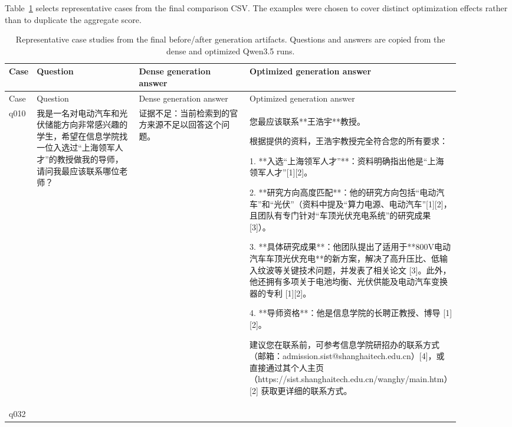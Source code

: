 \documentclass{article}
\begin{document}
\begin{CJK*}{UTF8}{gbsn}
Table~\ref{tab:generation-cases} selects representative cases from the final comparison CSV. The examples were chosen to cover distinct optimization effects rather than to duplicate the aggregate score.

\begingroup
\scriptsize
\setlength{\LTpre}{4pt}
\setlength{\LTpost}{4pt}
\setlength{\tabcolsep}{3pt}
\newcommand{\casecell}[1]{\begin{minipage}[t]{\linewidth}\raggedright\sloppy #1\end{minipage}}
\begin{longtable}{p{0.05\linewidth}p{0.26\linewidth}p{0.29\linewidth}p{0.29\linewidth}}
\caption{Representative case studies from the final before/after generation artifacts. Questions and answers are copied from the dense and optimized Qwen3.5 runs.}
\label{tab:generation-cases}\\
\toprule
Case & Question & Dense generation answer & Optimized generation answer \\
\midrule
\endfirsthead
\toprule
Case & Question & Dense generation answer & Optimized generation answer \\
\midrule
\endhead
\bottomrule
\endfoot
q010 &
\casecell{我是一名对电动汽车和光伏储能方向非常感兴趣的学生，希望在信息学院找一位入选过“上海领军人才”的教授做我的导师，请问我最应该联系哪位老师？} &
\casecell{证据不足：当前检索到的官方来源不足以回答这个问题。} &
\casecell{您最应该联系**王浩宇**教授。\par
根据提供的资料，王浩宇教授完全符合您的所有要求：\par
1. **入选“上海领军人才”**：资料明确指出他是“上海领军人才”[1][2]。\par
2. **研究方向高度匹配**：他的研究方向包括“电动汽车”和“光伏”（资料中提及“算力电源、电动汽车”[1][2]，且团队有专门针对“车顶光伏充电系统”的研究成果 [3]）。\par
3. **具体研究成果**：他团队提出了适用于**800V电动汽车车顶光伏充电**的新方案，解决了高升压比、低输入纹波等关键技术问题，并发表了相关论文 [3]。此外，他还拥有多项关于电池均衡、光伏供能及电动汽车变换器的专利 [1][2]。\par
4. **导师资格**：他是信息学院的长聘正教授、博导 [1][2]。\par
建议您在联系前，可参考信息学院研招办的联系方式（邮箱：admission.\allowbreak sist@\allowbreak shanghaitech.\allowbreak edu.\allowbreak cn）[4]，或直接通过其个人主页（https://sist.\allowbreak shanghaitech.\allowbreak edu.cn/\allowbreak wanghy/\allowbreak main.htm）[2] 获取更详细的联系方式。} \\
\midrule
q032 &

\end{longtable}
\end{CJK*}
\end{document}
